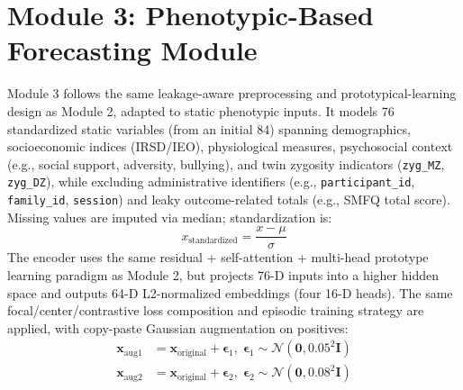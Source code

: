 \documentclass[10pt,letterpaper]{article}
\begin{document}
                                                                                                                  \section*{Module 3: Phenotypic-Based Forecasting Module}
                                                                                                                  Module 3 follows the same leakage-aware preprocessing and prototypical-learning design as Module 2, adapted to static phenotypic inputs. It models 76 standardized static variables (from an initial 84) spanning demographics, socioeconomic indices (IRSD/IEO), physiological measures, psychosocial context (e.g., social support, adversity, bullying), and twin zygosity indicators (\texttt{zyg\_MZ}, \texttt{zyg\_DZ}), while excluding administrative identifiers (e.g., \texttt{participant\_id}, \texttt{family\_id}, \texttt{session}) and leaky outcome-related totals (e.g., SMFQ total score). Missing values are imputed via median; standardization is:
                                                                                                                  \begin{equation} \label{eq_rob:25}
                                                                                                                  x_{\text{standardized}} = \frac{x - \mu}{\sigma}
                                                                                                                  \end{equation}
                                                                                                                  The encoder uses the same residual + self-attention + multi-head prototype learning paradigm as Module 2, but projects 76-D inputs into a higher hidden space and outputs 64-D L2-normalized embeddings (four 16-D heads). The same focal/center/contrastive loss composition and episodic training strategy are applied, with copy-paste Gaussian augmentation on positives:
                                                                                                                  \begin{align}
                                                                                                                  \mathbf{x}_{\text{aug1}} &= \mathbf{x}_{\text{original}} + \boldsymbol{\epsilon}_1,\;\boldsymbol{\epsilon}_1 \sim \mathcal{N}(\mathbf{0}, 0.05^2 \mathbf{I}) \label{eq_rob:26}\\
                                                                                                                  \mathbf{x}_{\text{aug2}} &= \mathbf{x}_{\text{original}} + \boldsymbol{\epsilon}_2,\;\boldsymbol{\epsilon}_2 \sim \mathcal{N}(\mathbf{0}, 0.08^2 \mathbf{I})
                                                                                                                   \label{eq_rob:27}\end{align}
\end{document}

